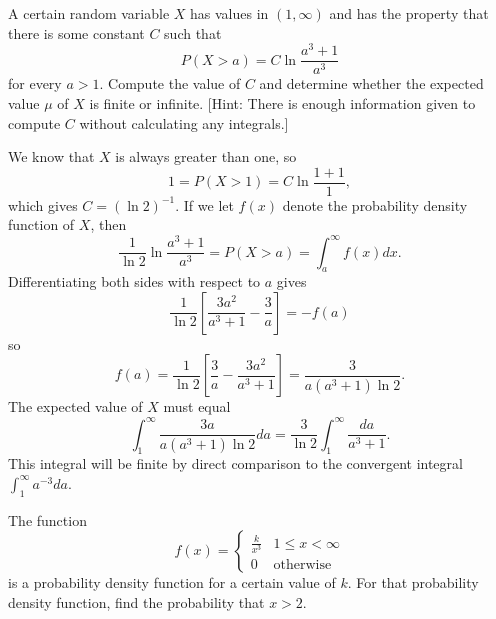 \documentclass{ximera}
\begin{document}
\begin{question}%
A certain random variable $X$ has values in $(1,\infty)$ and has the property that there is some constant $C$ such that
\[ P( X > a) = C \ln \frac{a^3+1}{a^3} \]
for every $a > 1$. Compute the value of $C$ and determine whether the expected value $\mu$ of $X$ is finite or infinite. [Hint: There is enough information given to compute $C$ without calculating any integrals.]
\begin{multipleChoice}
\end{multipleChoice}


\begin{feedback}
We know that $X$ is always greater than one, so
\[ 1 = P(X > 1) = C \ln \frac{1+1}{1}, \]
which gives $C = (\ln 2)^{-1}$.  If we let $f(x)$ denote the probability density function of $X$, then
\[ \frac{1}{\ln 2} \ln \frac{a^3+1}{a^3} = P(X > a) = \int_a^\infty f(x) dx. \]
Differentiating both sides with respect to $a$ gives
\[ \frac{1}{\ln 2} \left[ \frac{3 a^2}{a^3+1} - \frac{3}{a} \right] = - f(a) \]
so 
\[ f(a) = \frac{1}{\ln 2} \left[ \frac{3}{a} - \frac{3a^2}{a^3+1} \right] = \frac{3}{a(a^3+1) \ln 2}. \]
The expected value of $X$ must equal
\[ \int_1^\infty \frac{3a}{a(a^3+1) \ln 2} da = \frac{3}{\ln 2} \int_1^\infty \frac{da}{a^3+1}. \]
This integral will be finite by direct comparison to the convergent integral $\int_1^\infty a^{-3} da$.
\end{feedback}
\end{question}

\begin{question}%

The function 
\[ f(x) = \begin{cases} \displaystyle \frac{k}{x^3} & 1 \leq x < \infty \\ 0 & \text{otherwise} \end{cases} \]
is a probability density function for a certain value of \(k\). For that probability density function, find the probability that \(x > 2\).
\begin{multiplechoice}
\end{multiplechoice}

\end{question}
\end{document}
